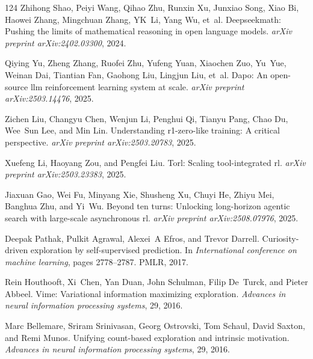 \documentclass[]{youtu} %
\begin{document}
\begin{thebibliography}{124}
Zhihong Shao, Peiyi Wang, Qihao Zhu, Runxin Xu, Junxiao Song, Xiao Bi, Haowei Zhang, Mingchuan Zhang, YK~Li, Yang Wu, et~al.
\newblock Deepseekmath: Pushing the limits of mathematical reasoning in open language models.
\newblock \emph{arXiv preprint arXiv:2402.03300}, 2024.

Qiying Yu, Zheng Zhang, Ruofei Zhu, Yufeng Yuan, Xiaochen Zuo, Yu~Yue, Weinan Dai, Tiantian Fan, Gaohong Liu, Lingjun Liu, et~al.
\newblock Dapo: An open-source llm reinforcement learning system at scale.
\newblock \emph{arXiv preprint arXiv:2503.14476}, 2025.

Zichen Liu, Changyu Chen, Wenjun Li, Penghui Qi, Tianyu Pang, Chao Du, Wee~Sun Lee, and Min Lin.
\newblock Understanding r1-zero-like training: A critical perspective.
\newblock \emph{arXiv preprint arXiv:2503.20783}, 2025{}.

Xuefeng Li, Haoyang Zou, and Pengfei Liu.
\newblock Torl: Scaling tool-integrated rl.
\newblock \emph{arXiv preprint arXiv:2503.23383}, 2025{}.

Jiaxuan Gao, Wei Fu, Minyang Xie, Shusheng Xu, Chuyi He, Zhiyu Mei, Banghua Zhu, and Yi~Wu.
\newblock Beyond ten turns: Unlocking long-horizon agentic search with large-scale asynchronous rl.
\newblock \emph{arXiv preprint arXiv:2508.07976}, 2025.

Deepak Pathak, Pulkit Agrawal, Alexei~A Efros, and Trevor Darrell.
\newblock Curiosity-driven exploration by self-supervised prediction.
\newblock In \emph{International conference on machine learning}, pages 2778--2787. PMLR, 2017.

Rein Houthooft, Xi~Chen, Yan Duan, John Schulman, Filip De~Turck, and Pieter Abbeel.
\newblock Vime: Variational information maximizing exploration.
\newblock \emph{Advances in neural information processing systems}, 29, 2016.

Marc Bellemare, Sriram Srinivasan, Georg Ostrovski, Tom Schaul, David Saxton, and Remi Munos.
\newblock Unifying count-based exploration and intrinsic motivation.
\newblock \emph{Advances in neural information processing systems}, 29, 2016.


\end{thebibliography}
\end{document}
